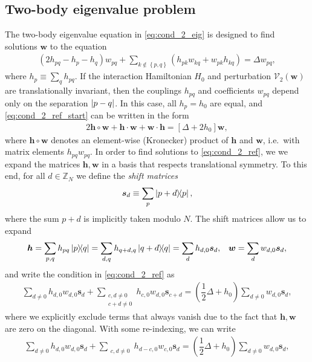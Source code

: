 \documentclass[nofootinbib,notitlepage,11pt]{revtex4-2}
\newcommand{\f}[2]{\dfrac{#1}{#2}} %
\newcommand{\p}[1]{\left(#1\right)} %
\renewcommand{\sp}[1]{\left[#1\right]} %
\renewcommand{\set}[1]{\left\{#1\right\}} %
\renewcommand{\c}{\cdot} %
\newcommand{\m}{\bm} %
\newcommand{\1}{\mathds{1}}
\newcommand{\V}{\mathcal{V}}
\newcommand{\ZZ}{\mathbb{Z}}
\begin{document}
\subsection{Two-body eigenvalue problem}
\label{sec:trans_inv_two}

The two-body eigenvalue equation in \eqref{eq:cond_2_eig} is designed
to find solutions $\m w$ to the equation
\begin{align}
  \p{2h_{pq}-h_p-h_q} w_{pq}
  + \sum_{k\notin\set{p,q}} \p{h_{pk} w_{kq} + w_{pk} h_{kq}}
  = \Delta w_{pq},
  \label{eq:cond_2_ref_start}
\end{align}
where $h_p\equiv\sum_q h_{pq}$.  If the interaction Hamiltonian $H_0$
and perturbation $\V_2\p{\m w}$ are translationally invariant, then
the couplings $h_{pq}$ and coefficients $w_{pq}$ depend only on the
separation $\abs{p-q}$.  In this case, all $h_p=h_0$ are equal, and
\eqref{eq:cond_2_ref_start} can be written in the form
\begin{align}
  2 \m h\circ \m w + \m h\c\m w + \m w\c\m h
  = \sp{\Delta + 2h_0} \m w,
  \label{eq:cond_2_ref}
\end{align}
where $\m h\circ\m w$ denotes an element-wise (Kronecker) product of
$\m h$ and $\m w$, i.e.~with matrix elements $h_{pq}w_{pq}$.  In order
to find solutions to \eqref{eq:cond_2_ref}, we we expand the matrices
$\m h,\m w$ in a basis that respects translational symmetry.  To this
end, for all $d\in\ZZ_N$ we define the {\it shift matrices}
\begin{align}
  \m s_d \equiv \sum_p \op{p+d}{p},
\end{align}
where the sum $p+d$ is implicitly taken modulo $N$.  The shift
matrices allow us to expand
\begin{align}
  \m h = \sum_{p,q} h_{pq} \op{p}{q}
  = \sum_{d,q} h_{q+d,q} \op{q+d}{q}
  = \sum_d h_{d,0} \m s_d,
  &&
  \m w = \sum_d w_{d,0} \m s_d,
\end{align}
and write the condition in \eqref{eq:cond_2_ref} as
\begin{align}
  \sum_{d\ne 0} h_{d,0} w_{d,0} \m s_d
  + \sum_{\substack{c,d\ne0\\c+d\ne0}} h_{c,0} w_{d,0} \m s_{c+d}
  = \p{\f12\Delta + h_0} \sum_{d\ne 0} w_{d,0} \m s_d,
\end{align}
where we explicitly exclude terms that always vanish due to the fact
that $\m h,\m w$ are zero on the diagonal.  With some re-indexing, we
can write
\begin{align}
  \sum_{d\ne 0} h_{d,0} w_{d,0} \m s_d
  + \sum_{\substack{c,d\ne0}} h_{d-c,0} w_{c,0} \m s_d
  = \p{\f12\Delta + h_0} \sum_{d\ne 0} w_{d,0} \m s_d,
  \label{eq:cond_2_shift}
\end{align}
\end{document}
